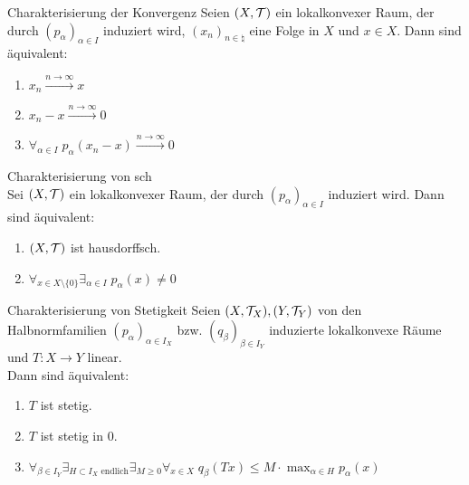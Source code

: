 \begin{Lemma}{Charakterisierung der Konvergenz}
    Seien $(X, \mathcal{T})$ ein lokalkonvexer Raum, der durch $(p_\alpha)_{\alpha \in I}$ induziert wird,
    $(x_n)_{n \in \natural}$ eine Folge in $X$ und $x \in X$.
    Dann sind äquivalent:
    \begin{enumerate}
        \item
        $x_n \xrightarrow{n \to \infty} x$

        \item
        $x_n - x \xrightarrow{n \to \infty} 0$

        \item
        $\forall_{\alpha \in I}\; p_\alpha(x_n - x) \xrightarrow{n \to \infty} 0$
    \end{enumerate}
\end{Lemma}

\linie

\begin{Lemma}{Charakterisierung von sch}\\
    Sei $(X, \mathcal{T})$ ein lokalkonvexer Raum, der durch $(p_\alpha)_{\alpha \in I}$ induziert wird.
    Dann sind äquivalent:
    \begin{enumerate}
        \item
        $(X, \mathcal{T})$ ist hausdorffsch.

        \item
        $\forall_{x \in X \setminus \{0\}} \exists_{\alpha \in I}\; p_\alpha(x) \not= 0$
    \end{enumerate}
\end{Lemma}

\linie

\begin{Lemma}{Charakterisierung von Stetigkeit}
    Seien $(X, \mathcal{T}_X), (Y, \mathcal{T}_Y)$ von den Halbnormfamilien $(p_\alpha)_{\alpha \in I_X}$ bzw.
    $(q_\beta)_{\beta \in I_Y}$ induzierte lokalkonvexe Räume und $T\colon X \rightarrow Y$
    linear.\\
    Dann sind äquivalent:
    \begin{enumerate}
        \item
        $T$ ist stetig.

        \item
        $T$ ist stetig in $0$.

        \item
        $\forall_{\beta \in I_Y} \exists_{H \subset I_X \text{ endlich}} \exists_{M \ge 0}
        \forall_{x \in X}\; q_\beta(Tx) \le M \cdot \max_{\alpha \in H} p_\alpha(x)$
    \end{enumerate}
\end{Lemma}

